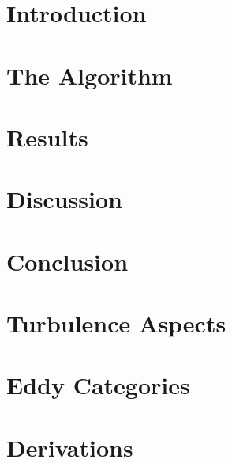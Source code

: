 


\frontmatter
%

%
\tableofcontents %
\newpage

\FloatBarrier

\mainmatter
\chapter{Introduction}

\chapter{The Algorithm}


\chapter{Results}

\chapter{Discussion}

\chapter{Conclusion}


\FloatBarrier

\appendix
\small
\begin{appendices}
\chapter{Turbulence Aspects}

\chapter{Eddy Categories}

\chapter{Derivations}

\end{appendices}
\FloatBarrier

